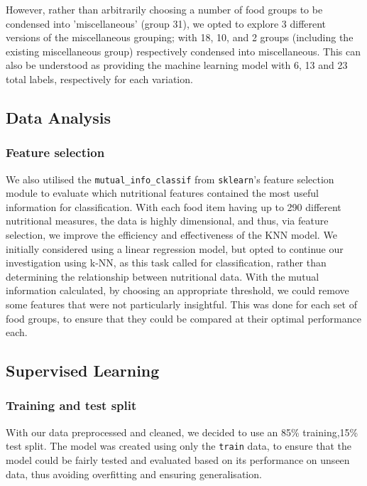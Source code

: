 \documentclass[11pt]{article}
\begin{document}
However, rather than arbitrarily choosing a number of food groups to be condensed into 'miscellaneous' (group 31), we opted to explore 3 different versions of the miscellaneous grouping; with 18, 10, and 2 groups (including the existing miscellaneous group) respectively condensed into miscellaneous. This can also be understood as providing the machine learning model with 6, 13 and 23 total labels, respectively for each variation.

\subsection{Data Analysis}
\subsubsection{Feature selection}

We also utilised the \verb|mutual_info_classif| from \verb|sklearn|'s feature selection module to evaluate which nutritional features contained the most useful information for classification. With each food item having up to 290 different nutritional measures, the data is highly dimensional, and thus, via feature selection, we improve the efficiency and effectiveness of the KNN model. We initially considered using a linear regression model, but opted to continue our investigation using k-NN, as this task called for classification, rather than determining the relationship between nutritional data. With the mutual information calculated, by choosing an appropriate threshold, we could remove some features that were not particularly insightful. This was done for each set of food groups, to ensure that they could be compared at their optimal performance each. 

\subsection{Supervised Learning}

\subsubsection{Training and test split}

With our data preprocessed and cleaned, we decided to use an 85\% training,15\% test split.  The model was created using only the \verb|train| data, to ensure that the model could be fairly tested and evaluated based on its performance on unseen data, thus avoiding overfitting and ensuring generalisation. 
\end{document}
